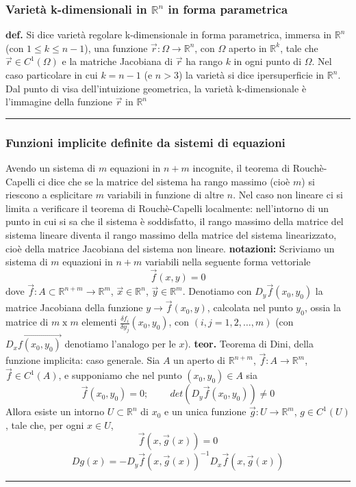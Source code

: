 \subsubsection*{Varietà k-dimensionali in $\mathbb{R}^n$ in forma parametrica}
\textbf{def.} Si dice varietà regolare k-dimensionale in forma parametrica, immersa in $\mathbb{R}^n$ (con $1 \leq k \leq n-1$), una funzione $\vec{r} : \Omega \rightarrow \mathbb{R}^n$, con $\Omega$ aperto in $\mathbb{R}^k$, tale che $\vec{r} \in C^1(\Omega)$ e la matriche Jacobiana di $\vec{r}$ ha rango $k$ in ogni punto di $\Omega$.\newline
Nel caso particolare in cui $k = n-1$ (e $n > 3$) la varietà si dice ipersuperficie in $\mathbb{R}^n$.\newline
Dal punto di visa dell'intuizione geometrica, la varietà k-dimensionale è l'immagine della funzione $\vec{r}$ in $\mathbb{R}^n$\newline
\rule{\textwidth}{0,4pt}
\subsubsection*{Funzioni implicite definite da sistemi di equazioni}
Avendo un sistema di $m$ equazioni in $n+m$ incognite, il teorema di Rouchè-Capelli ci dice che se la matrice del sistema ha rango massimo (cioè $m$) si riescono a esplicitare $m$ variabili in funzione di altre $n$. \newline
Nel caso non lineare ci si limita a verificare il teorema di Rouchè-Capelli localmente: nell'intorno di un punto in cui si sa che il sistema è soddisfatto, il rango massimo della matrice del sistema lineare diventa il rango massimo della matrice del sistema linearizzato, cioè della matrice Jacobiana del sistema non lineare.\newline
\newline
\textbf{notazioni:}\newline
Scriviamo un sistema di $m$ equazioni in $n+m$ variabili nella seguente forma vettoriale
\[
    \vec{f}(x, y) = 0
\]
dove $\vec{f}: A \subset \mathbb{R}^{n+m} \rightarrow \mathbb{R}^m$, $\vec{x} \in \mathbb{R}^n$, $\vec{y} \in \mathbb{R}^m$.\newline
Denotiamo con $D_y \vec{f}(x_0, y_0)$ la matrice Jacobiana della funzione $y \rightarrow \vec{f}(x_0, y)$, calcolata nel punto $y_0$, ossia la matrice di $m \; \text{x}\; m$ elementi $\frac{\delta f_i}{\delta y_j}(x_0, y_0)$, con $(i,j = 1, 2, \dots, m)$ (con $D_x \vec{f(x_0, y_0)}$ denotiamo l'analogo per le $x$).\newline
\newline
\textbf{teor.} Teorema di Dini, della funzione implicita: caso generale. \newline
Sia $A$ un aperto di $\mathbb{R}^{n+m}$, $\vec{f}: A \rightarrow \mathbb{R}^m$, $\vec{f} \in C^1(A)$, e supponiamo che nel punto $(x_0, y_0) \in A$ sia
\[
    \vec{f}(x_0, y_0) = 0 ; \;\;\;\;\;\;\;\;det(D_y \vec{f}(x_0, y_0)) \neq 0
\]
Allora esiste un intorno $U \subset \mathbb{R}^n$ di $x_0$ e un unica funzione $\vec{g} : U \rightarrow \mathbb{R}^m$, $g \in C^1(U)$, tale che, per ogni $x \in U$,
\[
    \vec{f} (x,\vec{g}(x)) = 0
\]
\[
    Dg(x) =-D_y \vec{f}(x,\vec{g}(x))^{-1}D_x \vec{f} (x, \vec{g}(x))
\]
\rule{\textwidth}{0,4pt}
